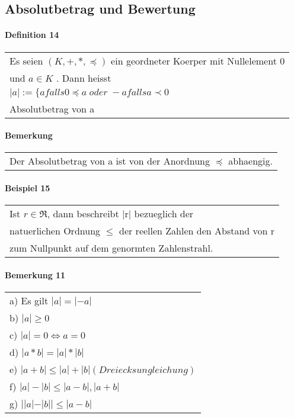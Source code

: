 \documentclass{scrartcl}
\begin{document}
\subsection{Absolutbetrag und Bewertung}

\paragraph{Definition 14}
\begin{tabbing}
\begin{tabular}{l}
Es seien $(K,+,*,\preceq)$ ein geordneter Koerper mit Nullelement 0\\
und $a\in K$ . Dann heisst\\
$|a|:=\lbrace a falls 0 \preceq a\; oder\; -a falls a\prec 0$ \\
Absolutbetrag von a
\end{tabular}
\end{tabbing}

\paragraph{Bemerkung}
\begin{tabbing}
\begin{tabular}{l}
Der Absolutbetrag von a ist von der Anordnung $\preceq$ abhaengig.
\end{tabular}
\end{tabbing}

\paragraph{Beispiel 15}
\begin{tabbing}
\begin{tabular}{l}
Ist $r\in \Re$, dann beschreibt |r| bezueglich der\\
natuerlichen Ordnung $\leq$ der reellen Zahlen den Abstand von r\\
zum Nullpunkt auf dem genormten Zahlenstrahl.
\end{tabular}
\end{tabbing}

\paragraph{Bemerkung 11}
\begin{tabbing}
\begin{tabular}{l}
a) Es gilt $|a|=|-a|$\\
b) $|a| \geq 0$\\
c) $|a| = 0 \Leftrightarrow a=0$\\
d) $|a*b| = |a|*|b|$\\
e) $|a+b| \leq |a|+|b| (Dreiecksungleichung)$\\
f) $|a|-|b| \leq |a-b|,|a+b|$\\
g) $||a|-|b|| \leq  |a-b|$\\
\end{tabular}
\end{tabbing}
\end{document}
